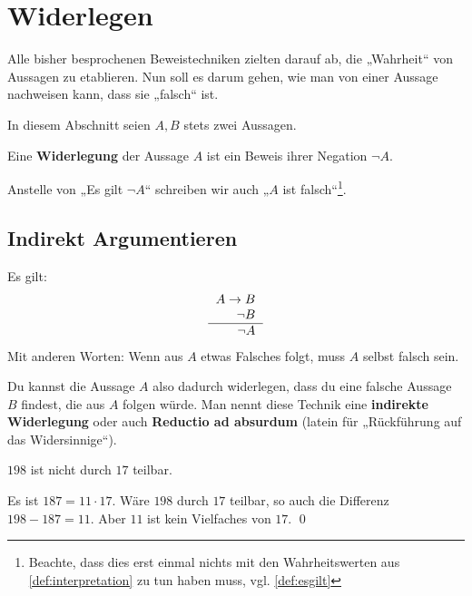 \section{Widerlegen}


Alle bisher besprochenen Beweistechniken zielten darauf ab, die „Wahrheit“ von Aussagen zu etablieren. Nun soll es darum gehen, wie man von einer Aussage nachweisen kann, dass sie „falsch“ ist.

In diesem Abschnitt seien $A,B$ stets zwei Aussagen.


\begin{de}[Widerlegung] 
    Eine \textbf{Widerlegung} der Aussage $A$ ist ein Beweis ihrer Negation $\neg A$.
    
    Anstelle von „Es gilt $\neg A$“ schreiben wir auch „$A$ ist falsch“\footnote{Beachte, dass dies erst einmal nichts mit den Wahrheitswerten aus \cref{def:interpretation} zu tun haben muss, vgl. \cref{def:esgilt}}.
\end{de}


\subsection*{Indirekt Argumentieren}


\begin{axiom} \label{reductio}
    Es gilt:
    \[\begin{tabular}{r}
        $A\to B$ \\
        $\neg B$ \\ \hline
        $\neg A$
    \end{tabular} \]
    Mit anderen Worten: Wenn aus $A$ etwas Falsches folgt, muss $A$ selbst falsch sein.
    
    Du kannst die Aussage $A$ also dadurch widerlegen, dass du eine falsche Aussage $B$ findest, die aus $A$ folgen würde. Man nennt diese Technik eine \textbf{indirekte Widerlegung} oder auch \textbf{Reductio ad absurdum} (latein für „Rückführung auf das Widersinnige“).
\end{axiom}


\begin{bsp} \label{bsp:reductio}
    $198$ ist nicht durch $17$ teilbar.
\end{bsp}


\begin{bew}
    Es ist $187=11\cdot 17$. Wäre $198$ durch $17$ teilbar, so auch die Differenz $198-187 = 11$. Aber $11$ ist kein Vielfaches von $17$. \qed
\end{bew}


